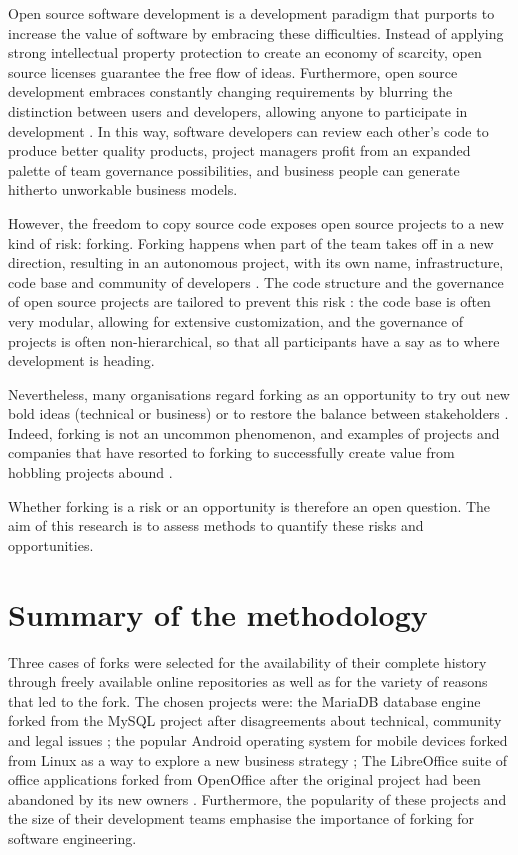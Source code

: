 Open source software development is a development paradigm that purports to increase the value of software by embracing these difficulties. Instead of applying strong intellectual property protection to create an economy of scarcity, open source licenses guarantee the free flow of ideas. Furthermore, open source development embraces constantly changing requirements by blurring the distinction between users and developers, allowing anyone to participate in development \citep{Hippel2003}. In this way, software developers can review each other's code to produce better quality products, project managers profit from an expanded palette of team governance possibilities, and business people can generate hitherto unworkable business models.

However, the freedom to copy source code exposes open source projects to a new kind of risk: forking. Forking happens when part of the team takes off in a new direction, resulting in an autonomous project, with its own name, infrastructure, code base and community of developers \citep{Robles2012a}. The code structure and the governance of open source projects are tailored to prevent this risk \citep{Kogut2001a}: the code base is often very modular, allowing for extensive customization, and the governance of projects is often non-hierarchical, so that all participants have a say as to where development is heading.

Nevertheless, many organisations regard forking as an opportunity to try out new bold ideas (technical or business) or to restore the balance between stakeholders \citep{Nyman2013a}. Indeed, forking is not an uncommon phenomenon, and examples of projects and companies that have resorted to forking to successfully create value from hobbling projects abound \citep{Robles2012a}.

Whether forking is a risk or an opportunity is therefore an open question. The aim of this research is to assess methods to quantify these risks and opportunities.


\section*{Summary of the methodology}

Three cases of forks were selected for the availability of their complete history through freely available online repositories as well as for the variety of reasons that led to the fork. The chosen projects were: the MariaDB database engine forked from the MySQL project after disagreements about technical, community and legal issues \citep{Widenius2012}; the popular Android operating system for mobile devices forked from Linux as a way to explore a new business strategy \citep{Elgin2005}; The LibreOffice suite of office applications forked from OpenOffice after the original project had been abandoned by its new owners \citep{Gamalielsson2014b}. Furthermore, the popularity of these projects and the size of their development teams emphasise the importance of forking for software engineering.

